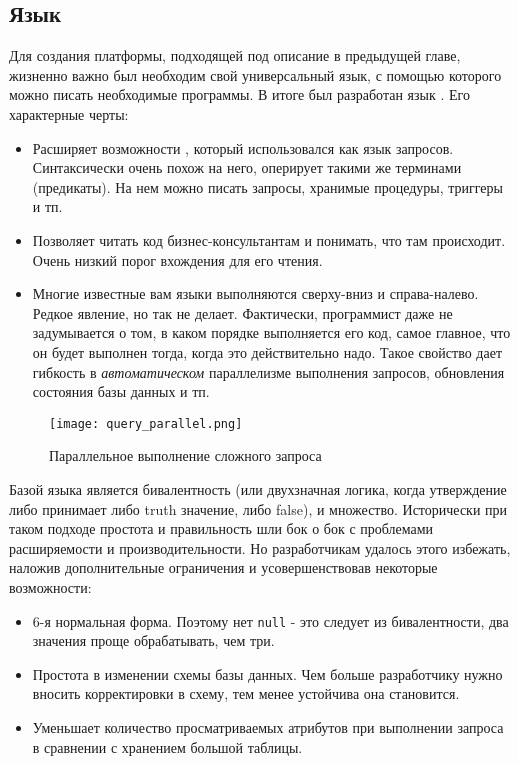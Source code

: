 \subsection{Язык \logiql}
\label{sec:technology:logiql}

Для создания платформы, подходящей под описание в предыдущей главе, жизненно важно был необходим свой универсальный язык, с помощью которого можно писать необходимые программы. В итоге был разработан язык \logiql. Его характерные черты:

\begin{itemize}
  \item Расширяет возможности \datalog, который использовался как язык запросов. Синтаксически очень похож на него, оперирует такими же терминами (предикаты). На нем можно писать запросы, хранимые процедуры, триггеры и тп.
  \item Позволяет читать код бизнес-консультантам и понимать, что там происходит. Очень низкий порог вхождения для его чтения.
  \item Многие известные вам языки выполняются сверху-вниз и справа-налево. Редкое явление, но \logiql так не делает. Фактически, программист даже не задумывается о том, в каком порядке выполняется его код, самое главное, что он будет выполнен тогда, когда это действительно надо. Такое свойство дает гибкость в \emph{автоматическом} параллелизме выполнения запросов, обновления состояния базы данных и тп.
\end{itemize}

\begin{figure}
	\centering
	\texttt{[image: query\_parallel.png]}
	\caption{Параллельное выполнение сложного запроса \cite{query_parallel_execution}}
	\label{fig:technology:logiql:query_parallel}
\end{figure}

Базой языка является бивалентность (или двухзначная логика, когда утверждение либо принимает либо truth значение, либо false), и множество. Исторически при таком подходе простота и правильность шли бок о бок с проблемами расширяемости и производительности. Но разработчикам \logiql удалось этого избежать, наложив дополнительные ограничения и усовершенствовав некоторые возможности:

\begin{itemize}
  \item 6-я нормальная форма. Поэтому нет \lstinline{null} - это следует из бивалентности, два значения проще обрабатывать, чем три.
  \item Простота в изменении схемы базы данных. Чем больше разработчику нужно вносить корректировки в схему, тем менее устойчива она становится.
  \item Уменьшает количество просматриваемых атрибутов при выполнении запроса в сравнении с хранением большой таблицы.
\end{itemize}

